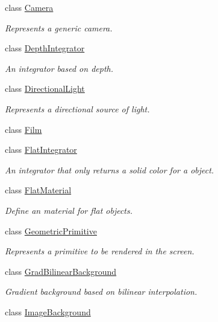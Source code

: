 \begin{DoxyCompactItemize}
class \mbox{\hyperlink{classomg_1_1_camera}{Camera}}
\begin{DoxyCompactList}\small\item\em Represents a generic camera. \end{DoxyCompactList}\item 
class \mbox{\hyperlink{classomg_1_1_depth_integrator}{Depth\+Integrator}}
\begin{DoxyCompactList}\small\item\em An integrator based on depth. \end{DoxyCompactList}\item 
class \mbox{\hyperlink{classomg_1_1_directional_light}{Directional\+Light}}
\begin{DoxyCompactList}\small\item\em Represents a directional source of light. \end{DoxyCompactList}\item 
class \mbox{\hyperlink{classomg_1_1_film}{Film}}
\item 
class \mbox{\hyperlink{classomg_1_1_flat_integrator}{Flat\+Integrator}}
\begin{DoxyCompactList}\small\item\em An integrator that only returns a solid color for a object. \end{DoxyCompactList}\item 
class \mbox{\hyperlink{classomg_1_1_flat_material}{Flat\+Material}}
\begin{DoxyCompactList}\small\item\em Define an material for flat objects. \end{DoxyCompactList}\item 
class \mbox{\hyperlink{classomg_1_1_geometric_primitive}{Geometric\+Primitive}}
\begin{DoxyCompactList}\small\item\em Represents a primitive to be rendered in the screen. \end{DoxyCompactList}\item 
class \mbox{\hyperlink{classomg_1_1_grad_bilinear_background}{Grad\+Bilinear\+Background}}
\begin{DoxyCompactList}\small\item\em Gradient background based on bilinear interpolation. \end{DoxyCompactList}\item 
class \mbox{\hyperlink{classomg_1_1_image_background}{Image\+Background}}
\item 

\end{DoxyCompactItemize}
